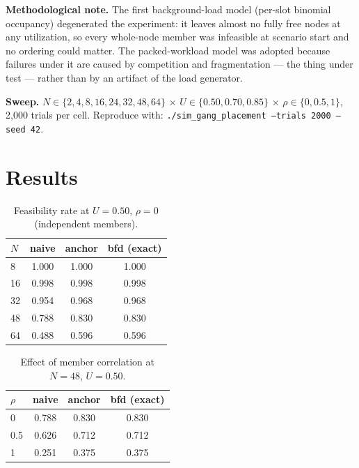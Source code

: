 \documentclass[11pt]{article}
\newcommand{\code}[1]{\texttt{#1}}
\begin{document}
\textbf{Methodological note.} The first background-load model (per-slot
binomial occupancy) degenerated the experiment: it leaves almost no fully
free nodes at any utilization, so every whole-node member was infeasible at
scenario start and no ordering could matter. The packed-workload model was
adopted because failures under it are caused by competition and
fragmentation --- the thing under test --- rather than by an artifact of
the load generator.

\textbf{Sweep.} $N \in \{2,4,8,16,24,32,48,64\}$ $\times$
$U \in \{0.50, 0.70, 0.85\}$ $\times$ $\rho \in \{0, 0.5, 1\}$, 2{,}000
trials per cell. Reproduce with:
\code{./sim\_gang\_placement --trials 2000 --seed 42}.

\section{Results}

\begin{table}[h]
\centering
\begin{tabular}{lccc}
\toprule
$N$ & naive & anchor & bfd (exact) \\
\midrule
8  & 1.000 & 1.000 & 1.000 \\
16 & 0.998 & 0.998 & 0.998 \\
32 & 0.954 & 0.968 & 0.968 \\
48 & 0.788 & 0.830 & 0.830 \\
64 & 0.488 & 0.596 & 0.596 \\
\bottomrule
\end{tabular}
\caption{Feasibility rate at $U = 0.50$, $\rho = 0$ (independent members).}
\end{table}

\begin{table}[h]
\centering
\begin{tabular}{lccc}
\toprule
$\rho$ & naive & anchor & bfd (exact) \\
\midrule
0   & 0.788 & 0.830 & 0.830 \\
0.5 & 0.626 & 0.712 & 0.712 \\
1   & 0.251 & 0.375 & 0.375 \\
\bottomrule
\end{tabular}
\caption{Effect of member correlation at $N = 48$, $U = 0.50$.}
\end{table}
\end{document}

